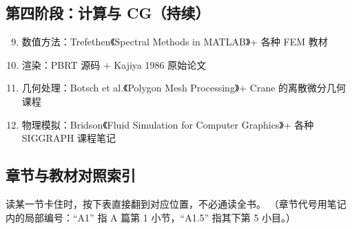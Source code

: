 \subsection{第四阶段：计算与 CG（持续）}
\begin{enumerate}
  \setcounter{enumi}{8}
  \item 数值方法：Trefethen《Spectral Methods in MATLAB》+ 各种 FEM 教材
  \item 渲染：PBRT 源码 + Kajiya 1986 原始论文
  \item 几何处理：Botsch et al.《Polygon Mesh Processing》+ Crane 的离散微分几何课程
  \item 物理模拟：Bridson《Fluid Simulation for Computer Graphics》+ 各种 SIGGRAPH 课程笔记
\end{enumerate}

\clearpage
\subsection{章节与教材对照索引}

读某一节卡住时，按下表直接翻到对应位置，不必通读全书。
（章节代号用笔记内的局部编号：“A1” 指 A 篇第 1 小节，“A1.5” 指其下第 5 小目。）

